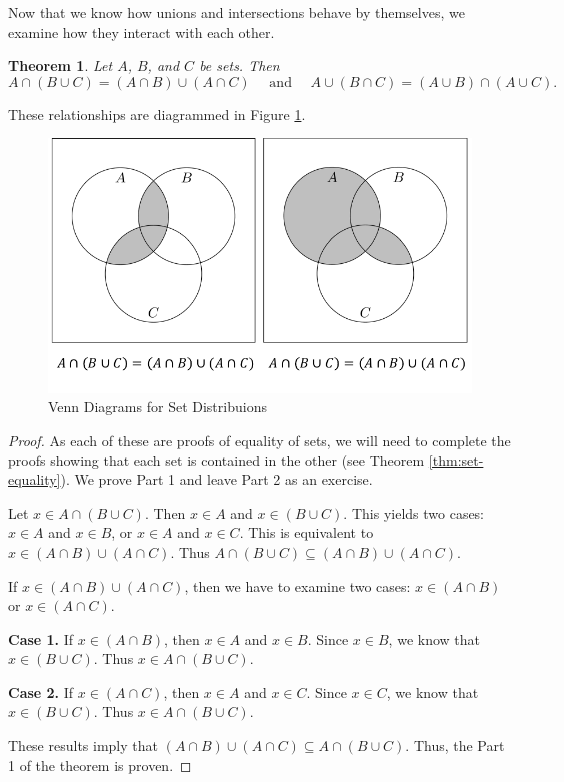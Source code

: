 \documentclass[
]{book}
\newtheorem{theorem}{Theorem}[chapter]
\theoremstyle{definition}
\theoremstyle{definition}
\theoremstyle{definition}
\theoremstyle{definition}
\theoremstyle{remark}
\begin{document}
Now that we know how unions and intersections behave by themselves, we examine how they interact with each other.

\begin{theorem}
\protect\hypertarget{thm:set-distribution}{}\label{thm:set-distribution}Let \(A\), \(B\), and \(C\) be sets. Then
\[ A \cap (B \cup C) = (A \cap B) \cup (A \cap C) \quad \mbox{ and } \quad  A \cup (B \cap C) = (A \cup B) \cap (A \cup C).\]
\end{theorem}

These relationships are diagrammed in Figure \ref{fig:set-distributions}.

\begin{figure}

{\centering \includegraphics[width=0.8\linewidth]{tikz/set-distribution} 

}

\caption{Venn Diagrams for Set Distribuions }\label{fig:set-distributions}
\end{figure}

\begin{proof}
As each of these are proofs of equality of sets, we will need to complete the proofs showing that each set is contained in the other (see Theorem \ref{thm:set-equality}). We prove Part 1 and leave Part 2 as an exercise.

Let \(x\in A \cap (B \cup C)\). Then \(x\in A\) and \(x\in (B\cup C)\). This yields two cases: \(x\in A\) and \(x\in B\), or \(x\in A\) and \(x\in C\). This is equivalent to \(x \in (A\cap B) \cup (A\cap C)\). Thus \(A \cap (B \cup C) \subseteq (A \cap B) \cup (A \cap C)\).

If \(x\in (A \cap B) \cup (A \cap C)\), then we have to examine two cases: \(x\in (A\cap B)\) or \(x\in (A \cap C)\).

\textbf{Case 1.} If \(x\in (A\cap B)\), then \(x\in A\) and \(x\in B\). Since \(x\in B\), we know that \(x\in (B\cup C)\). Thus \(x\in A \cap (B\cup C)\).

\textbf{Case 2.} If \(x \in (A\cap C)\), then \(x\in A\) and \(x\in C\). Since \(x\in C\), we know that \(x \in (B\cup C)\). Thus \(x \in A \cap (B\cup C)\).

These results imply that \((A \cap B) \cup (A \cap C) \subseteq A \cap (B \cup C)\). Thus, the Part 1 of the theorem is proven.
\end{proof}
\end{document}
